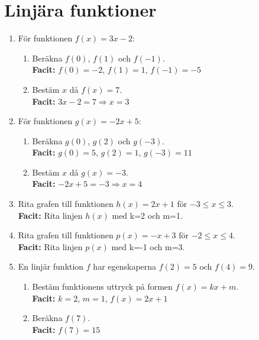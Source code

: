 \documentclass[a4paper,11pt]{article}
\begin{document}
\section*{Linjära funktioner}

\begin{enumerate}[label=\textbf{\arabic*.}]
    \item För funktionen $f(x) = 3x - 2$:
    \begin{enumerate}[label=\alph*)]
        \item Beräkna $f(0)$, $f(1)$ och $f(-1)$.
        \\ \textbf{Facit:} $f(0) = -2$, $f(1) = 1$, $f(-1) = -5$
        \item Bestäm $x$ då $f(x) = 7$.
        \\ \textbf{Facit:} $3x-2=7 \Rightarrow x=3$
    \end{enumerate}
    
    \item För funktionen $g(x) = -2x + 5$:
    \begin{enumerate}[label=\alph*)]
        \item Beräkna $g(0)$, $g(2)$ och $g(-3)$.
        \\ \textbf{Facit:} $g(0)=5$, $g(2)=1$, $g(-3)=11$
        \item Bestäm $x$ då $g(x) = -3$.
        \\ \textbf{Facit:} $-2x+5=-3 \Rightarrow x=4$
    \end{enumerate}
    
    \item Rita grafen till funktionen $h(x) = 2x + 1$ för $-3 \leq x \leq 3$.
    \\ \textbf{Facit:} Rita linjen $h(x)$ med k=2 och m=1.
    
    \item Rita grafen till funktionen $p(x) = -x + 3$ för $-2 \leq x \leq 4$.
    \\ \textbf{Facit:} Rita linjen $p(x)$ med k=-1 och m=3.
    
    \item En linjär funktion $f$ har egenskaperna $f(2) = 5$ och $f(4) = 9$.
    \begin{enumerate}[label=\alph*)]
        \item Bestäm funktionens uttryck på formen $f(x) = kx + m$.
        \\ \textbf{Facit:} $k=2$, $m=1$, $f(x)=2x+1$
        \item Beräkna $f(7)$.
        \\ \textbf{Facit:} $f(7)=15$
    \end{enumerate}
    

\end{enumerate}
\end{document}
